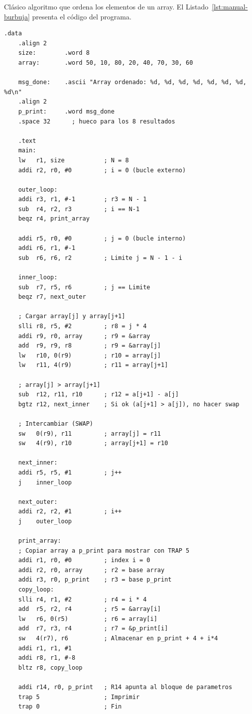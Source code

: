 \documentclass[../main.tex]{subfiles}
\begin{document}
Clásico algoritmo que ordena los elementos de un array. El Listado~\ref{lst:manual-burbuja} presenta el código del programa.

\begin{lstlisting}[caption={Algoritmo de la burbuja que ordena un array y muestra el resultado por pantalla.},label={lst:manual-burbuja}]
	.data
	.align 2
	size:        .word 8
	array:       .word 50, 10, 80, 20, 40, 70, 30, 60
	
	msg_done:    .ascii "Array ordenado: %d, %d, %d, %d, %d, %d, %d, %d\n"
	.align 2
	p_print:     .word msg_done
	.space 32      ; hueco para los 8 resultados
	
	.text
	main:
	lw   r1, size           ; N = 8
	addi r2, r0, #0         ; i = 0 (bucle externo)
	
	outer_loop:
	addi r3, r1, #-1        ; r3 = N - 1
	sub  r4, r2, r3         ; i == N-1
	beqz r4, print_array
	
	addi r5, r0, #0         ; j = 0 (bucle interno)
	addi r6, r1, #-1
	sub  r6, r6, r2         ; Limite j = N - 1 - i
	
	inner_loop:
	sub  r7, r5, r6         ; j == Limite
	beqz r7, next_outer
	
	; Cargar array[j] y array[j+1]
	slli r8, r5, #2         ; r8 = j * 4
	addi r9, r0, array      ; r9 = &array
	add  r9, r9, r8         ; r9 = &array[j]
	lw   r10, 0(r9)         ; r10 = array[j]
	lw   r11, 4(r9)         ; r11 = array[j+1]
	
	; array[j] > array[j+1]
	sub  r12, r11, r10      ; r12 = a[j+1] - a[j]
	bgtz r12, next_inner    ; Si ok (a[j+1] > a[j]), no hacer swap
	
	; Intercambiar (SWAP)
	sw   0(r9), r11         ; array[j] = r11
	sw   4(r9), r10         ; array[j+1] = r10
	
	next_inner:
	addi r5, r5, #1         ; j++
	j    inner_loop
	
	next_outer:
	addi r2, r2, #1         ; i++
	j    outer_loop
	
	print_array:
	; Copiar array a p_print para mostrar con TRAP 5
	addi r1, r0, #0         ; index i = 0
	addi r2, r0, array      ; r2 = base array
	addi r3, r0, p_print    ; r3 = base p_print
	copy_loop:
	slli r4, r1, #2         ; r4 = i * 4
	add  r5, r2, r4         ; r5 = &array[i]
	lw   r6, 0(r5)          ; r6 = array[i]
	add  r7, r3, r4         ; r7 = &p_print[i]
	sw   4(r7), r6          ; Almacenar en p_print + 4 + i*4
	addi r1, r1, #1
	addi r8, r1, #-8
	bltz r8, copy_loop
	
	addi r14, r0, p_print   ; R14 apunta al bloque de parametros
	trap 5                  ; Imprimir
	trap 0                  ; Fin
\end{lstlisting}
\end{document}
